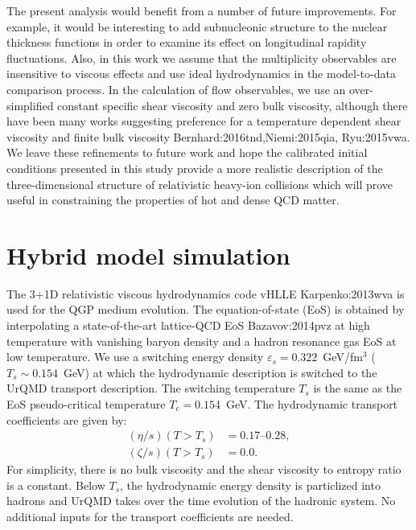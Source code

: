 The present analysis would benefit from a number of future improvements.
For example, it would be interesting to add subnucleonic structure to the nuclear thickness functions in order to examine its effect on longitudinal rapidity fluctuations.
Also, in this work we assume that the multiplicity observables are insensitive to viscous effects and use ideal hydrodynamics in the model-to-data comparison process.
In the calculation of flow observables, we use an over-simplified constant specific shear viscosity and zero bulk viscosity, although there have been many works suggesting preference for a temperature dependent shear viscosity and finite bulk viscosity {Bernhard:2016tnd,Niemi:2015qia, Ryu:2015vwa}.
We leave these refinements to future work and hope the calibrated initial conditions presented in this study provide a more realistic description of the three-dimensional structure of relativistic heavy-ion collisions which will prove useful in constraining the properties of hot and dense QCD matter.


\section{Hybrid model simulation}\label{app}

The 3+1D relativistic viscous hydrodynamics code \mbox{vHLLE} {Karpenko:2013wva} is used for the QGP medium evolution. 
The equation-of-state (EoS) is obtained by interpolating a state-of-the-art lattice-QCD EoS {Bazavov:2014pvz} at high temperature with vanishing baryon density and a hadron resonance gas EoS at low temperature.
We use a switching energy density $\varepsilon_s = 0.322$~GeV/fm$^3$ ($T_s\sim0.154$~GeV) at which the hydrodynamic description is switched to the UrQMD transport description. 
The switching temperature $T_s$ is the same as the EoS pseudo-critical temperature $T_c = 0.154$~GeV. 
The hydrodynamic transport coefficients are given by:
\begin{align}
  (\eta/s)(T>T_s)  &=  \text{0.17--0.28}, \\
  (\zeta/s)(T>T_s) &=  0.0.
\end{align}
For simplicity, there is no bulk viscosity and the shear viscosity to entropy ratio is a constant.
Below $T_s$, the hydrodynamic energy density is particlized into hadrons and UrQMD takes over the time evolution of the hadronic system.
No additional inputs for the transport coefficients are needed.
